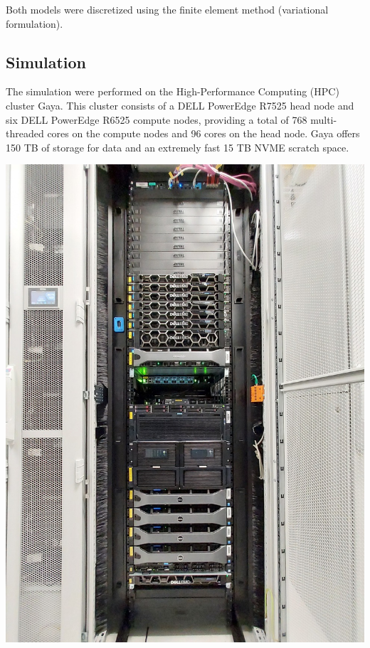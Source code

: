\documentclass[12pt]{article}
\begin{document}
Both models were discretized using the finite element method (variational formulation).

\subsection{Simulation}
\begin{minipage}[t]{0.45\textwidth}
\raggedright
The simulation were performed on the High-Performance Computing (HPC) cluster Gaya. 
This cluster consists of a DELL PowerEdge R7525 head node and six DELL PowerEdge 
R6525 compute nodes, providing a total of 768 multi-threaded cores on the compute 
nodes and 96 cores on the head node. Gaya offers 150 TB of storage for data and 
an extremely fast 15 TB NVME scratch space.
\end{minipage}
\hfill
\begin{minipage}[t]{0.45\textwidth}
\raggedleft
\includegraphics[width=\textwidth, angle=-90]{images/gaya.jpeg}
\end{minipage}
\end{document}
